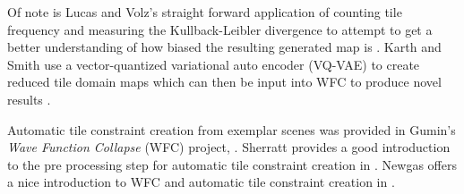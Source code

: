 Of note is Lucas and Volz's straight forward application of counting tile frequency and measuring the Kullback-Leibler divergence
to attempt to get a better understanding of how biased the resulting generated map is \cite{Lucas_Volz_2019}.
Karth and Smith use a vector-quantized variational auto encoder (VQ-VAE) to create reduced tile domain maps which can then
be input into WFC to produce novel results \cite{Karth_Smith_2017}.

Automatic tile constraint creation from exemplar scenes was provided in Gumin's \textit{Wave Function Collapse} (WFC) project, \cite{Gumin_2016}.
Sherratt provides a good introduction to the pre processing step for automatic tile constraint creation in \cite{Sherratt_2019}.
Newgas offers a nice introduction to WFC and automatic tile constraint creation in \cite{BorisTheBrave_wfc_2021}.



